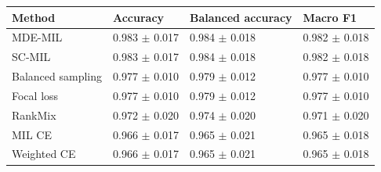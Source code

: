 \begin{tabular}{llll}
\toprule
Method & Accuracy & Balanced accuracy & Macro F1\\
\midrule
MDE-MIL & \num{0.983} $\pm$ \num{0.017} & \num{0.984} $\pm$ \num{0.018} & \num{0.982} $\pm$ \num{0.018}\\
SC-MIL & \num{0.983} $\pm$ \num{0.017} & \num{0.984} $\pm$ \num{0.018} & \num{0.982} $\pm$ \num{0.018}\\
Balanced sampling & \num{0.977} $\pm$ \num{0.010} & \num{0.979} $\pm$ \num{0.012} & \num{0.977} $\pm$ \num{0.010}\\
Focal loss & \num{0.977} $\pm$ \num{0.010} & \num{0.979} $\pm$ \num{0.012} & \num{0.977} $\pm$ \num{0.010}\\
RankMix & \num{0.972} $\pm$ \num{0.020} & \num{0.974} $\pm$ \num{0.020} & \num{0.971} $\pm$ \num{0.020}\\
MIL CE & \num{0.966} $\pm$ \num{0.017} & \num{0.965} $\pm$ \num{0.021} & \num{0.965} $\pm$ \num{0.018}\\
Weighted CE & \num{0.966} $\pm$ \num{0.017} & \num{0.965} $\pm$ \num{0.021} & \num{0.965} $\pm$ \num{0.018}\\
\bottomrule
\end{tabular}
